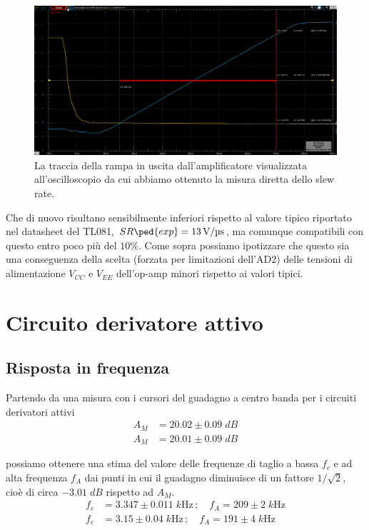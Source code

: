 \documentclass[10pt,a4paper]{article}
\begin{document}
\begin{figure}[htbp]
\centering
\includegraphics[scale=0.37]{slew}
\caption{La traccia della rampa in uscita dall'amplificatore visualizzata
all'oscilloscopio da cui abbiamo ottenuto la misura diretta dello slew rate.
\label{fig: slewrate}}
\end{figure}

Che di nuovo risultano sensibilmente inferiori rispetto al valore tipico
riportato nel datasheet del TL081, $SR\ped{exp} = \SI{13}{\V/\micro\s}$,
ma comunque compatibili con questo entro poco più del $10\%$. Come sopra
possiamo ipotizzare che questo sia una conseguenza della scelta (forzata
per limitazioni dell'AD2) delle tensioni di alimentazione $V_{CC}$ e $V_{EE}$
dell'op-amp minori rispetto ai valori tipici.

\section{Circuito derivatore attivo}
\subsection{Risposta in frequenza}
Partendo da una misura con i cursori del guadagno a centro banda per i
circuiti derivatori attivi
\begin{align*}
A_M &= 20.02 \pm  0.09 \; \si{dB} \\
A_M &= 20.01 \pm  0.09 \; \si{dB}
\end{align*}

possiamo ottenere una stima del valore delle frequenze di taglio a bassa
$f_c$ e ad alta frequenza $f_A$ dai punti in cui il guadagno diminuisce di un
fattore $1/\sqrt{2}$, cioè di circa $-3.01 \; \si{dB}$ rispetto ad $A_M$.
\begin{align*}
f_c &= 3.347 \pm 0.011 \; \si{k\Hz} \, ; \quad f_A = 209 \pm 2 \; \si{k\Hz} \\
f_c &= 3.15 \pm 0.04 \; \si{k\Hz} \, ; \quad f_A = 191 \pm 4 \; \si{k\Hz}
\end{align*}
\end{document}
